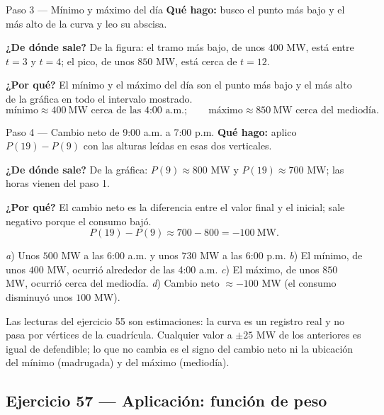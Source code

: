 \documentclass[11pt]{article}
\begin{document}
\begin{paso}{Paso 3 --- Mínimo y máximo del día}
\textbf{Qué hago:} busco el punto más bajo y el más alto de la curva y leo su abscisa.

\textbf{¿De dónde sale?} De la figura: el tramo más bajo, de unos $400$ MW, está entre $t=3$ y $t=4$; el pico, de unos $850$ MW, está cerca de $t=12$.

\textbf{¿Por qué?} El mínimo y el máximo del día son el punto más bajo y el más alto de la gráfica en todo el intervalo mostrado.
\[
\text{mínimo} \approx 400\ \text{MW cerca de las 4:00 a.m.};\qquad
\text{máximo} \approx 850\ \text{MW cerca del mediodía}.
\]
\end{paso}

\begin{paso}{Paso 4 --- Cambio neto de 9:00 a.m. a 7:00 p.m.}
\textbf{Qué hago:} aplico $P(19)-P(9)$ con las alturas leídas en esas dos verticales.

\textbf{¿De dónde sale?} De la gráfica: $P(9)\approx 800$ MW y $P(19)\approx 700$ MW; las horas vienen del paso 1.

\textbf{¿Por qué?} El cambio neto es la diferencia entre el valor final y el inicial; sale negativo porque el consumo bajó.
\[
P(19)-P(9)\approx 700-800=-100\ \text{MW}.
\]
\end{paso}

\begin{resp}
\emph{a}) Unos $500$ MW a las 6:00 a.m. y unos $730$ MW a las 6:00 p.m. \quad
\emph{b}) El mínimo, de unos $400$ MW, ocurrió alrededor de las 4:00 a.m. \quad
\emph{c}) El máximo, de unos $850$ MW, ocurrió cerca del mediodía. \quad
\emph{d}) Cambio neto $\approx -100$ MW (el consumo disminuyó unos $100$ MW).
\end{resp}

\begin{nota}
Las lecturas del ejercicio 55 son estimaciones: la curva es un registro real y no pasa por vértices de la cuadrícula. Cualquier valor a $\pm 25$ MW de los anteriores es igual de defendible; lo que no cambia es el signo del cambio neto ni la ubicación del mínimo (madrugada) y del máximo (mediodía).
\end{nota}

\subsection*{Ejercicio 57 — Aplicación: función de peso}
\end{document}

